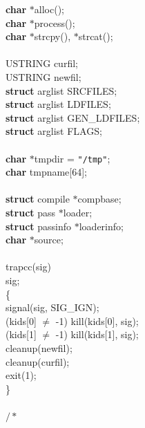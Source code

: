 \begin{flushleft}
{\bf char} $\ast$alloc();\mbox{}\\
{\bf char} $\ast$process();\mbox{}\\
{\bf char} $\ast$strcpy(), $\ast$strcat();\mbox{}\\
\mbox{}\\
USTRING curfil;\mbox{}\\
USTRING newfil;\mbox{}\\
{\bf struct} arglist SRCFILES;\mbox{}\\
{\bf struct} arglist LDFILES;\mbox{}\\
{\bf struct} arglist GEN\_LDFILES;\mbox{}\\
{\bf struct} arglist FLAGS;\mbox{}\\
\mbox{}\\
{\bf char} $\ast$tmpdir = {\tt"/tmp"};\mbox{}\\
{\bf char} tmpname[64];\mbox{}\\
\mbox{}\\
{\bf struct} compile $\ast$compbase;\mbox{}\\
{\bf struct} pass $\ast$loader;\mbox{}\\
{\bf struct} passinfo $\ast$loaderinfo;\mbox{}\\
{\bf char} $\ast$source;\mbox{}\\
\mbox{}\\
trapcc(sig)\mbox{}\\
\hspace*{3\indentation}{\bf int} sig;\mbox{}\\
\{\mbox{}\\
\hspace*{3\indentation}signal(sig, SIG\_IGN);\mbox{}\\
\hspace*{3\indentation}{\bf if} (kids[0] $\neq$ -1) kill(kids[0], sig);\mbox{}\\
\hspace*{3\indentation}{\bf if} (kids[1] $\neq$ -1) kill(kids[1], sig);\mbox{}\\
\hspace*{3\indentation}cleanup(newfil);\mbox{}\\
\hspace*{3\indentation}cleanup(curfil);\mbox{}\\
\hspace*{3\indentation}exit(1);\mbox{}\\
\}\mbox{}\\
\mbox{}\\
{$/\ast$\it{}\mbox{}\\
}
\end{flushleft}
